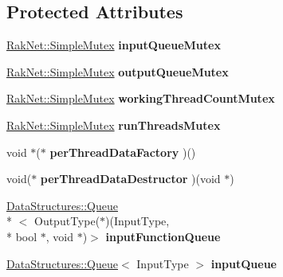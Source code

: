 \subsection*{Protected Attributes}
\begin{DoxyCompactItemize}
\item 
\hypertarget{struct_thread_pool_af047935d4a3523c4f6ce4e82af991a8b}{\hyperlink{class_rak_net_1_1_simple_mutex}{Rak\-Net\-::\-Simple\-Mutex} {\bfseries input\-Queue\-Mutex}}\label{struct_thread_pool_af047935d4a3523c4f6ce4e82af991a8b}

\item 
\hypertarget{struct_thread_pool_a13ddd8f74e243d5235e28f094a66882a}{\hyperlink{class_rak_net_1_1_simple_mutex}{Rak\-Net\-::\-Simple\-Mutex} {\bfseries output\-Queue\-Mutex}}\label{struct_thread_pool_a13ddd8f74e243d5235e28f094a66882a}

\item 
\hypertarget{struct_thread_pool_a3489d0e612addb63b3fb86c3dc3062da}{\hyperlink{class_rak_net_1_1_simple_mutex}{Rak\-Net\-::\-Simple\-Mutex} {\bfseries working\-Thread\-Count\-Mutex}}\label{struct_thread_pool_a3489d0e612addb63b3fb86c3dc3062da}

\item 
\hypertarget{struct_thread_pool_a9569bed4376f0b8893bdfeb2f3773dd3}{\hyperlink{class_rak_net_1_1_simple_mutex}{Rak\-Net\-::\-Simple\-Mutex} {\bfseries run\-Threads\-Mutex}}\label{struct_thread_pool_a9569bed4376f0b8893bdfeb2f3773dd3}

\item 
\hypertarget{struct_thread_pool_aacf9c53af2e2bae9560f1520ad63a1e9}{void $\ast$($\ast$ {\bfseries per\-Thread\-Data\-Factory} )()}\label{struct_thread_pool_aacf9c53af2e2bae9560f1520ad63a1e9}

\item 
\hypertarget{struct_thread_pool_ac2f69d2ba866370e2899980a06d29df4}{void($\ast$ {\bfseries per\-Thread\-Data\-Destructor} )(void $\ast$)}\label{struct_thread_pool_ac2f69d2ba866370e2899980a06d29df4}

\item 
\hypertarget{struct_thread_pool_aba1210d4a8738dbb73fd4aba224a5437}{\hyperlink{class_data_structures_1_1_queue}{Data\-Structures\-::\-Queue}\\*
$<$ Output\-Type($\ast$)(Input\-Type, \\*
bool $\ast$, void $\ast$)$>$ {\bfseries input\-Function\-Queue}}\label{struct_thread_pool_aba1210d4a8738dbb73fd4aba224a5437}

\item 
\hypertarget{struct_thread_pool_ac808a3f10661465e2d83a4e7579dc880}{\hyperlink{class_data_structures_1_1_queue}{Data\-Structures\-::\-Queue}$<$ Input\-Type $>$ {\bfseries input\-Queue}}\label{struct_thread_pool_ac808a3f10661465e2d83a4e7579dc880}


\end{DoxyCompactItemize}
